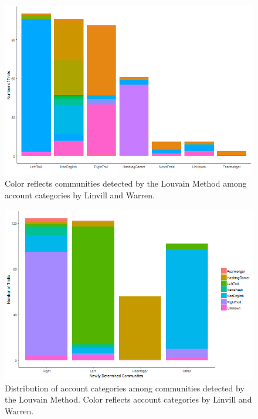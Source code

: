 \documentclass[12pt, titlepage=true, toc=bib]{scrartcl}
\begin{document}
\begin{figure}[!ht]
\centering
\includegraphics[width=0.95\linewidth]{final_figure1.png}%
\caption[Distribution of communities among account categories]{Color reflects communities detected by the Louvain Method among account categories by Linvill and Warren.}
\label{fig:distcom}
\end{figure}

\begin{figure}[!ht]
\centering
\includegraphics[width=0.95\linewidth]{final_figure2.png}%
\caption[Distribution of account categories among communities]{Distribution of account categories among communities detected by the Louvain Method. Color reflects account categories by Linvill and Warren.}
\label{fig:distcat}
\end{figure}
\end{document}
